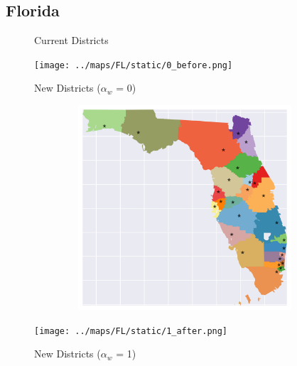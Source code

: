 \subsection{Florida}
\begin{figure}[htb!] \centering
\caption{ Current Districts }
\texttt{[image: ../maps/FL/static/0\_before.png]}
\caption{ New Districts ($\alpha_w$ = 0) }
\includegraphics[width=5in,height=3in,keepaspectratio]{../maps/FL/static/0_after.png}
\caption{ New Districts ($\alpha_w$ = 1) }
\texttt{[image: ../maps/FL/static/1\_after.png]}
\end{figure}

\clearpage
\newpage

